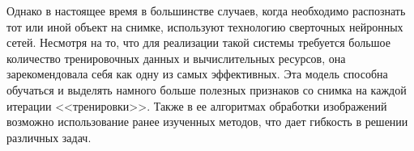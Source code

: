 Однако в настоящее время в большинстве случаев, когда необходимо распознать тот или иной объект на снимке, используют технологию сверточных нейронных сетей. Несмотря на то, что для реализации такой системы требуется большое количество тренировочных данных и вычислительных ресурсов, она зарекомендовала себя как одну из самых эффективных. Эта модель способна обучаться и выделять намного больше полезных признаков со снимка на каждой итерации <<тренировки>>. Также в ее алгоритмах обработки изображений возможно использование ранее изученных методов, что дает гибкость в решении различных задач.

